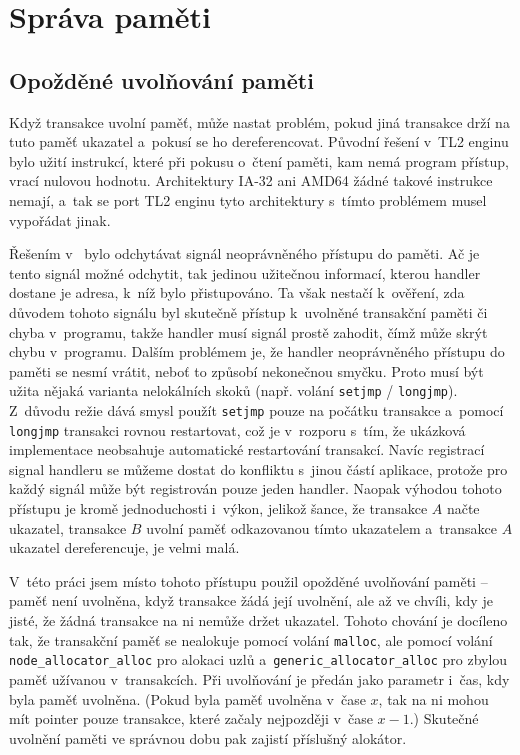 
\section{Správa paměti}

\subsection{Opožděné uvolňování paměti}
Když transakce uvolní paměť, může nastat problém, pokud jiná transakce drží na tuto
paměť ukazatel a~pokusí se ho dereferencovat. Původní řešení v~TL2 enginu bylo
užití instrukcí, které při pokusu o~čtení paměti, kam nemá program přístup,
vrací nulovou hodnotu. Architektury IA-32 ani AMD64 žádné takové instrukce
nemají, a~tak se port TL2 enginu tyto architektury \cite{STMcur} s~tímto
problémem musel vypořádat jinak.

Řešením v~\cite{STMcur} bylo odchytávat signál neoprávněného přístupu do paměti.
Ač je tento signál možné odchytit, tak jedinou užitečnou informací, kterou
handler dostane je adresa, k~níž bylo přistupováno. Ta však nestačí k~ověření,
zda důvodem tohoto signálu byl skutečně přístup k~uvolněné transakční paměti
či chyba v~programu, takže handler musí signál prostě zahodit, čímž může
skrýt chybu v~programu. Dalším problémem je, že handler neoprávněného přístupu
do paměti se nesmí vrátit, neboť to způsobí nekonečnou smyčku. Proto musí být
užita nějaká varianta nelokálních skoků (např. volání \verb|setjmp| / \verb|longjmp|).
Z~důvodu režie
dává smysl použít \verb|setjmp| pouze na počátku transakce a~pomocí \verb|longjmp|
transakci rovnou restartovat, což je v~rozporu s~tím, že ukázková implementace
neobsahuje automatické restartování transakcí. Navíc registrací signal handleru
se můžeme dostat do konfliktu s~jinou částí aplikace, protože pro každý signál
může být registrován pouze jeden handler.
Naopak výhodou tohoto přístupu
je kromě jednoduchosti i~výkon, jelikož šance, že transakce $A$ načte ukazatel,
transakce $B$ uvolní paměť odkazovanou tímto ukazatelem a~transakce $A$ ukazatel
dereferencuje, je velmi malá.

V~této práci jsem místo tohoto přístupu použil opožděné uvolňování paměti --
paměť není uvolněna, když transakce žádá její uvolnění, ale až ve chvíli,
kdy je jisté, že žádná transakce na ni nemůže držet ukazatel.
Tohoto chování je docíleno tak, že transakční paměť se nealokuje pomocí volání
\verb|malloc|, ale pomocí volání \verb|node_allocator_alloc| pro alokaci uzlů
a~\verb|generic_allocator_alloc| pro zbylou paměť užívanou v~transakcích. Při uvolňování
je předán jako parametr i~čas, kdy byla paměť uvolněna. (Pokud byla paměť uvolněna
v~čase $x$, tak na ni mohou mít pointer pouze transakce, které začaly nejpozději
v~čase $x - 1$.) Skutečné uvolnění paměti ve správnou dobu pak zajistí příslušný
alokátor.

